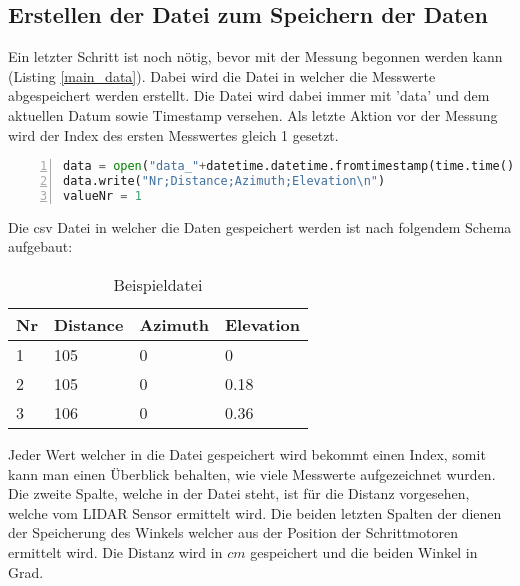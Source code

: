 \subsection{Erstellen der Datei zum Speichern der Daten}
Ein letzter Schritt ist noch nötig, bevor mit der Messung begonnen werden kann (Listing \ref{main_data}). Dabei wird die Datei in welcher die Messwerte abgespeichert werden erstellt. Die Datei wird dabei immer mit 'data' und dem aktuellen Datum sowie Timestamp versehen. Als letzte Aktion vor der Messung wird der Index des ersten Messwertes gleich 1 gesetzt.\\
\begin{lstlisting}[caption={Erstellen der Datei zum Speichern der Daten}, language={Python}, label={main_data}, numbers=left]
data = open("data_"+datetime.datetime.fromtimestamp(time.time()).strftime('%Y-%m-%d_%H-%M-%S')+".csv", "w")
data.write("Nr;Distance;Azimuth;Elevation\n")
valueNr = 1
\end{lstlisting}
Die \ac{csv} Datei in welcher die Daten gespeichert werden ist nach folgendem Schema aufgebaut:
\begin{table}[H]
	\centering
	\caption{Beispieldatei}
	\begin{tabular}{|l|l|l|l|}
		\hline
		\textbf{Nr} & \textbf{Distance} & \textbf{Azimuth} & \textbf{Elevation} \\\hline
		1  & 105      & 0       & 0         \\\hline
		2  & 105      & 0       & 0.18      \\\hline
		3  & 106      & 0       & 0.36      \\\hline
	\end{tabular}
\end{table}
Jeder Wert welcher in die Datei gespeichert wird bekommt einen Index, somit kann man einen Überblick behalten, wie viele Messwerte aufgezeichnet wurden. Die zweite Spalte, welche in der Datei steht, ist für die Distanz vorgesehen, welche vom \ac{LIDAR} Sensor ermittelt wird. Die beiden letzten Spalten der dienen der Speicherung des Winkels welcher aus der Position der Schrittmotoren ermittelt wird. Die Distanz wird in $cm$ gespeichert und die beiden Winkel in Grad.

